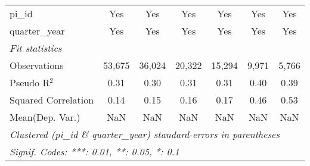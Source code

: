\begin{tabular}{lcccccc}
   pi\_id                                                     & Yes           & Yes           & Yes            & Yes           & Yes            & Yes\\  
   quarter\_year                                              & Yes           & Yes           & Yes            & Yes           & Yes            & Yes\\  
   \midrule
   \emph{Fit statistics}\\
   Observations                                               & 53,675        & 36,024        & 20,322         & 15,294        & 9,971          & 5,766\\  
   Pseudo R$^2$                                               & 0.31          & 0.30          & 0.31           & 0.31          & 0.40           & 0.39\\  
   Squared Correlation                                        & 0.14          & 0.15          & 0.16           & 0.17          & 0.46           & 0.53\\  
Mean(Dep. Var.) & NaN & NaN & NaN & NaN & NaN & NaN \\
   \midrule \midrule
   \multicolumn{7}{l}{\emph{Clustered (pi\_id \& quarter\_year) standard-errors in parentheses}}\\
   \multicolumn{7}{l}{\emph{Signif. Codes: ***: 0.01, **: 0.05, *: 0.1}}\\
\end{tabular}
\par\endgroup
